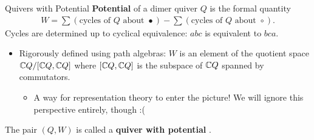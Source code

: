 \begin{frame}{Quivers with Potential}
    \textbf{Potential} of a dimer quiver $Q$ is the formal quantity \cite{bocklandtDimerABC2015}
    \begin{align*}
        W = \sum (\text{cycles of } Q \text{ about } \bullet) - \sum (\text{cycles of } Q \text{ about } \circ).
    \end{align*}
    Cycles are determined up to cyclical equivalence: $abc$ is equivalent to $bca$.
    \begin{itemize}
        \justifying
        \item Rigorously defined using path algebras: $W$ is an element of the quotient space $\mathbb{C} Q/[\mathbb{C} Q, \mathbb{C} Q]$ where $[\mathbb{C} Q, \mathbb{C} Q]$ is the subspace of $\mathbb{C} Q$ spanned by commutators.
        \begin{itemize}
            \item A way for representation theory to enter the picture! We will ignore this perspective entirely, though :(
        \end{itemize}
    \end{itemize}
    The pair $(Q, W)$ is called a \textbf{quiver with potential} \cite{derksenQuiversPotentialsTheir2007}.
\end{frame}

